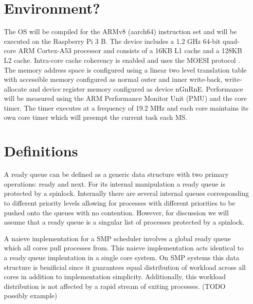 \documentclass{cys}
\begin{document}
\section{Environment?}
\label{sec:environment?}
The OS will be compiled for the ARMv8 (aarch64) instruction set and will be executed on the Raspberry Pi 3 B.  The device includes a 1.2 GHz 64-bit quad-core ARM Cortex-A53 processor and consists of a 16KB L1 cache and a 128KB L2 cache.  Intra-core cache coherency is enabled and uses the MOESI protocol \cite{https://developer.arm.com/docs/ddi0500/e/level-1-memory-system/cache-behavior/data-cache-coherency}.  The memory address space is configured using a linear two level translation table with accessible memory configured as normal outer and inner write-back, write-allocate and device register memory configured as device nGnRnE.  Performance will be measured using the ARM Performance Monitor Unit (PMU) and the core timer.  The timer executes at a frequency of 19.2 MHz and each core maintains its own core timer which will preempt the current task each MS. \cite{https://www.raspberrypi.org/documentation/hardware/raspberrypi/bcm2836/QA7_rev3.4.pdf}

\section{Definitions}
\label{sec:definitions}

A ready queue can be defined as a generic data structure with two primary operations: ready and next.  For its internal manipulation a ready queue is protected by a spinlock.  Internally there are several internal queues corresponding to different priority levels allowing for processes with different priorities to be pushed onto the queues with no contention.  However, for discussion we will assume that a ready queue is a singular list of processes protected by a spinlock.

A naieve implementation for a SMP scheduler involves a global ready queue which all cores pull processes from.  This naieve implementation acts identical to a ready queue implentation in a single core system.  On SMP systems this data structure is benificial since it guarantees equal distribution of workload across all cores in addition to implementation simplicity.  Additionally, this workload distribution is not affected by a rapid stream of exiting processes. (TODO possibly example)
\end{document}
